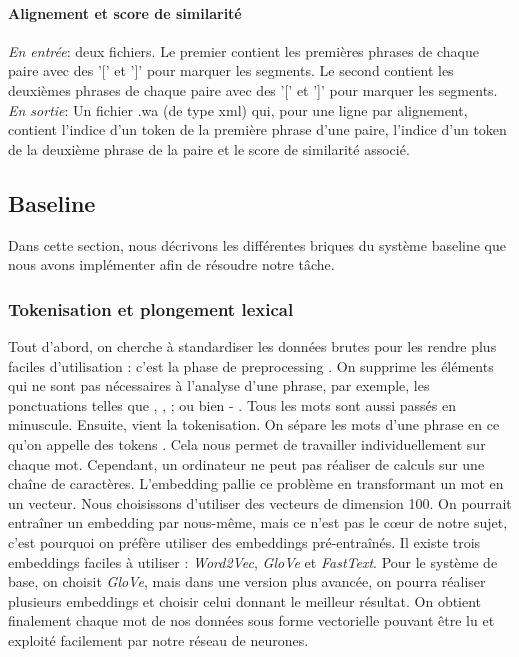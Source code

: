 \documentclass[a4paper, twoside, 11pt]{article}
\begin{document}
 \paragraph{Alignement et score de similarité}
    \hfill \break
    \textit{En entrée}: deux fichiers. Le premier contient les premières phrases de chaque paire avec des '[' et ']' pour marquer les segments. Le second contient les deuxièmes phrases de chaque paire avec des '[' et ']' pour marquer les segments. \hfill \break
    \textit{En sortie}: Un fichier .wa (de type xml) qui, pour une ligne par alignement, contient l'indice d'un token de la première phrase d'une paire, l'indice d'un token de la deuxième phrase de la paire et le score de similarité associé.



    \subsection{Baseline}

    Dans cette section, nous décrivons les différentes briques du système baseline que nous avons implémenter afin de résoudre notre tâche.

    \subsubsection{Tokenisation et plongement lexical}

Tout d’abord, on cherche à standardiser les données brutes pour les rendre plus faciles d'utilisation : c’est la phase de \og preprocessing \fg{}. On supprime les éléments qui ne sont pas nécessaires à l’analyse d’une phrase, par exemple, les ponctuations telles que \og , \fg{}, \og ; \fg{} ou bien \og - \fg{}. Tous les mots sont aussi passés en minuscule. Ensuite, vient la tokenisation. On sépare les mots d’une phrase en ce qu'on appelle des \og tokens \fg{}. Cela nous permet de travailler individuellement sur chaque mot.
Cependant, un ordinateur ne peut pas réaliser de calculs sur une chaîne de caractères. L’embedding pallie ce problème en transformant un mot en un vecteur. Nous choisissons d’utiliser des vecteurs de dimension 100. On pourrait entraîner un embedding par nous-même, mais ce n’est pas le cœur de notre sujet, c'est pourquoi on préfère utiliser des embeddings pré-entraînés. Il existe trois embeddings faciles à utiliser : \textit{Word2Vec}, \textit{GloVe} et \textit{FastText}. Pour le système de base, on choisit \textit{GloVe}, mais dans une version plus avancée, on pourra réaliser plusieurs embeddings et choisir celui donnant le meilleur résultat. On obtient finalement chaque mot de nos données sous forme vectorielle pouvant être lu et exploité facilement par notre réseau de neurones.
\end{document}
